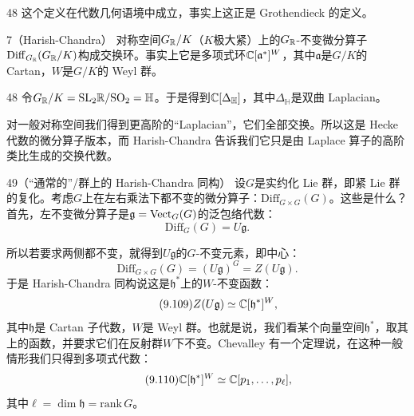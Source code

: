 \begin{srcrem}{48}
这个定义在代数几何语境中成立，事实上这正是 Grothendieck 的定义。
\end{srcrem}

\begin{srcthm}{7}（Harish-Chandra）
对称空间$G_{\mathbb{R}}/K$（$K$极大紧）上的$G_{\mathbb{R}}$-不变微分算子$\mathrm{Diff}_{G_{\mathbb{R}}}(G_{\mathbb{R}}/K)$构成交换环。事实上它是多项式环$\mathbb{C}[\mathfrak a^{*}]^{W}$，其中$\mathfrak a$是$G/K$的 Cartan，$W$是$G/K$的 Weyl 群。
\end{srcthm}

\begin{srcex}{48}
令$G_{\mathbb{R}}/K=\mathrm{SL}_2\mathbb{R}/\mathrm{SO}_2=\mathbb H$。于是得到$\mathbb{C}[\Delta_{\mathbb H}]$，其中$\Delta_{\mathbb H}$是双曲 Laplacian。
\end{srcex}

对一般对称空间我们得到更高阶的“Laplacian”，它们全部交换。所以这是 Hecke 代数的微分算子版本，而 Harish-Chandra 告诉我们它只是由 Laplace 算子的高阶类比生成的交换代数。

\begin{srcex}{49}（“通常的”/群上的 Harish-Chandra 同构）
设$G$是实约化 Lie 群，即紧 Lie 群的复化。考虑$G$上在左右乘法下都不变的微分算子：$\mathrm{Diff}_{G\times G}(G)$。这些是什么？首先，左不变微分算子是$\mathfrak g=\mathrm{Vect}_G(G)$的泛包络代数：
\begin{equation}\tag{9.107}
\mathrm{Diff}_{G}(G)=U\mathfrak g.
\end{equation}
\end{srcex}

所以若要求两侧都不变，就得到$U\mathfrak g$的$G$-不变元素，即中心：
\begin{equation}\tag{9.108}
\mathrm{Diff}_{G\times G}(G)=(U\mathfrak g)^{G}=Z(U\mathfrak g).
\end{equation}
于是 Harish-Chandra 同构说这是$\mathfrak h^{*}$上的$W$-不变函数：
\begin{equation}\tag{9.109}
Z(U\mathfrak g)\simeq\mathbb{C}[\mathfrak h^{*}]^{W},
\end{equation}
其中$\mathfrak h$是 Cartan 子代数，$W$是 Weyl 群。也就是说，我们看某个向量空间$\mathfrak h^{*}$，取其上的函数，并要求它们在反射群$W$下不变。Chevalley 有一个定理说，在这种一般情形我们只得到多项式代数：
\begin{equation}\tag{9.110}
\mathbb{C}[\mathfrak h^{*}]^{W}\simeq\mathbb{C}[p_1,\dots,p_{\ell}],
\end{equation}
其中$\ell=\dim\mathfrak h=\mathrm{rank}\,G$。

